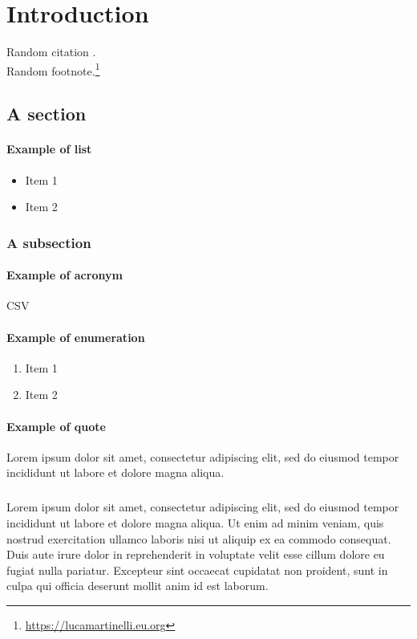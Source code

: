 
\chapter{Introduction}
\label{chp:intro}

Random citation \cite{alecci2021development}. \\
Random footnote.\footnote{\url{https://lucamartinelli.eu.org}}

\section{A section}

\subsubsection{Example of list}
\begin{itemize}
  \item Item 1
  \item Item 2
\end{itemize}

\subsection{A subsection}

\subsubsection{Example of acronym}
\ac{CSV}

\subsubsection{Example of enumeration}
\begin{enumerate}
  \item Item 1
  \item Item 2
\end{enumerate}

\subsubsection{Example of quote}
\begin{displayquote}
Lorem ipsum dolor sit amet, consectetur adipiscing elit, sed do eiusmod tempor incididunt ut labore et dolore magna aliqua.
\end{displayquote}

\paragraph{}
Lorem ipsum dolor sit amet, consectetur adipiscing elit, sed do eiusmod tempor incididunt ut labore et dolore magna aliqua. Ut enim ad minim veniam, quis nostrud exercitation ullamco laboris nisi ut aliquip ex ea commodo consequat. Duis aute irure dolor in reprehenderit in voluptate velit esse cillum dolore eu fugiat nulla pariatur. Excepteur sint occaecat cupidatat non proident, sunt in culpa qui officia deserunt mollit anim id est laborum.